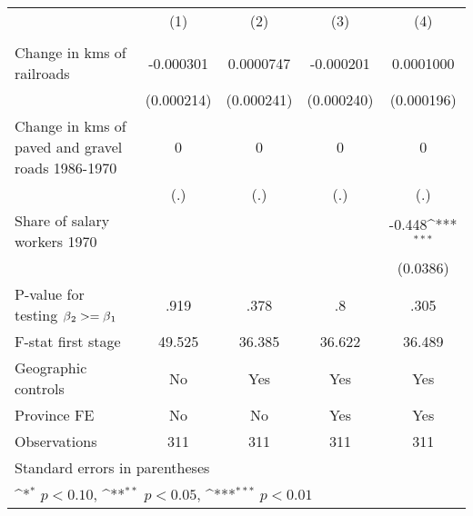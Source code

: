 {
\def\sym#1{\ifmmode^{#1}\else\(^{#1}\)\fi}
\begin{tabular}{l*{4}{c}}
\hline\hline
                &\multicolumn{1}{c}{(1)}&\multicolumn{1}{c}{(2)}&\multicolumn{1}{c}{(3)}&\multicolumn{1}{c}{(4)}\\
                &\multicolumn{1}{c}{}&\multicolumn{1}{c}{}&\multicolumn{1}{c}{}&\multicolumn{1}{c}{}\\
\hline
Change in kms of railroads&-0.000301         &0.0000747         &-0.000201         &0.0001000         \\
                &(0.000214)         &(0.000241)         &(0.000240)         &(0.000196)         \\
[1em]
Change in kms of paved and gravel roads 1986-1970&        0         &        0         &        0         &        0         \\
                &      (.)         &      (.)         &      (.)         &      (.)         \\
[1em]
Share of salary workers 1970&                  &                  &                  &   -0.448\sym{***}\\
                &                  &                  &                  & (0.0386)         \\
\hline
P-value for testing $\beta\\_2 >= \beta\\_1$&     .919         &     .378         &       .8         &     .305         \\
F-stat first stage&   49.525         &   36.385         &   36.622         &   36.489         \\
Geographic controls&       No         &      Yes         &      Yes         &      Yes         \\
Province FE     &       No         &       No         &      Yes         &      Yes         \\
Observations    &      311         &      311         &      311         &      311         \\
\hline\hline
\multicolumn{5}{l}{\footnotesize Standard errors in parentheses}\\
\multicolumn{5}{l}{\footnotesize \sym{*} \(p<0.10\), \sym{**} \(p<0.05\), \sym{***} \(p<0.01\)}\\
\end{tabular}
}
